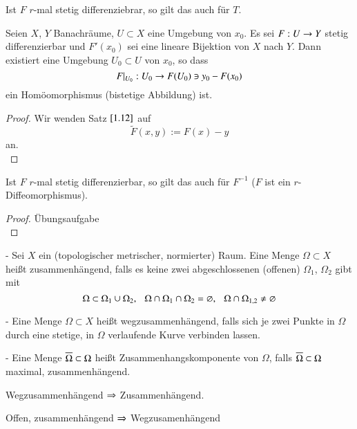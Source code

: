 \begin{remark}
    Ist $F$ $r$-mal stetig differenziebrar, so gilt das auch für $T$.
\end{remark}

\begin{theorem}\label{1.13}
    Seien $X$, $Y$ Banachräume, $U\subset X$ eine Umgebung von $x_0$. Es sei $F:U\rightarrow Y$ stetig 
    differenzierbar und $F'(x_0)$ sei eine lineare Bijektion von $X$ nach $Y$.
    Dann existiert eine Umgebung $U_0\subset U$ von $x_0$, so dass
    \[
        F|_{U_0}: U_0\rightarrow F(U_0)\ni y_0 -F(x_0)
    \]
    ein Homöomorphismus (bistetige Abbildung) ist.
\end{theorem}

\begin{proof}
    Wir wenden Satz $\ref{1.12}$ auf
    \[
        \tilde F(x,y):= F(x)-y
    \]
    an.
    \[  \]
\end{proof}

\begin{remark}
    Ist $F$ $r$-mal stetig differenzierbar, so gilt das auch für $F^{-1}$ ($F$ ist ein 
    $r$-Diffeomorphismus).
\end{remark}

\begin{proof}
    Übungsaufgabe\[ \]
\end{proof}

\begin{defi}\label{1.14}
    \begin{description}
    \item{-}
    Sei $X$ ein (topologischer metrischer, normierter) Raum. Eine Menge $\Omega \subset X$ heißt
    zusammenhängend, falls es keine zwei abgeschlossenen (offenen) $\Omega_1$, $\Omega_2$ gibt
    mit
    \[
        \Omega\subset\Omega_1\cup\Omega_2, \hspace{.25cm} \Omega\cap \Omega_1 \cap \Omega_2 = \varnothing, \hspace{.25cm}
        \Omega\cap\Omega_{1,2}\neq \varnothing
    \]
    \item{-}
    Eine Menge $\Omega\subset X$ heißt wegzusammenhängend, falls sich je zwei Punkte in $\Omega$ durch
    eine stetige, in $\Omega$ verlaufende Kurve verbinden lassen.
    \item{-}
    Eine Menge $\overline\Omega \subset \Omega$ heißt Zusammenhangskomponente von $\Omega$, falls
    $\overline \Omega \subset \Omega$ maximal, zusammenhängend.
    \end{description}
\end{defi}

\begin{remark}
    Wegzusammenhängend $\Rightarrow$ Zusammenhängend.

    \noindent Offen, zusammenhängend $\Rightarrow$ Wegzusamenhängend
\end{remark}

